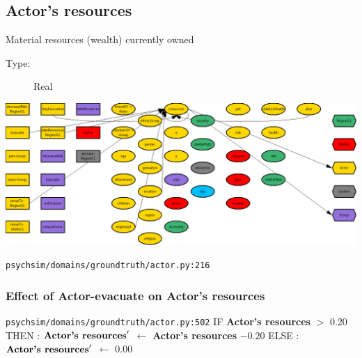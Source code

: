 \documentclass{article}%
\begin{document}
%
\subsection{Actor's resources}%
\label{subsec:Actor's resources}%
Material resources (wealth) currently owned%
\begin{description}%
\item[Type:]%
Real%
\end{description}%
\includegraphics[width=\textwidth]{images/resourcesOfActor.png}%
\begin{flushleft}%
\verb|psychsim/domains/groundtruth/actor.py:216|%
\end{flushleft}%
\subsubsection{Effect of Actor{-}evacuate on Actor's resources}%
\label{ssubsec:Effect of Actor{-}evacuate on Actor's resources}%
\begin{flushleft}%
\verb|psychsim/domains/groundtruth/actor.py:502|%
\linebreak%
IF %
\textbf{Actor's resources}%
$>$%
0.20%
\linebreak%
\hspace*{2em}%
THEN %
: %
$\mbox{\textbf{Actor's resources}} '$%
$\leftarrow$%
\textbf{Actor's resources}%
${-}0.20$%
\linebreak%
\hspace*{2em}%
ELSE %
: %
$\mbox{\textbf{Actor's resources}} '$%
$\leftarrow$%
0.00%
\end{flushleft}

%
\end{document}
